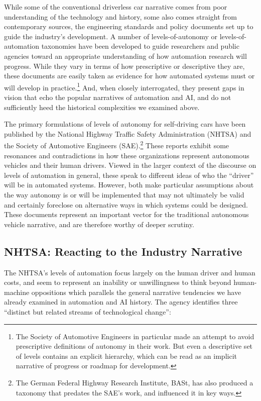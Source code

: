 While some of the conventional driverless car narrative comes from
poor understanding of the technology and history, some also comes
straight from contemporary sources, the engineering standards and
policy documents set up to
guide the industry's development. A number of levels-of-autonomy or
levels-of-automation taxonomies have been developed to guide
researchers and public agencies toward an appropriate understanding of
how automation research will progress. While they vary in terms of how
prescriptive or descriptive they are, these documents are easily taken
as evidence for how automated systems must or will develop in
practice.\footnote{The Society of Automotive Engineers in particular
  made an attempt to avoid prescriptive definitions of autonomy in
  their work. But even a descriptive set of levels contains an
  explicit hierarchy, which can be read as an implicit narrative of
  progress or roadmap for development.} And, when closely
interrogated, they present gaps in vision that echo the popular
narratives of automation and AI, and do not sufficiently heed the
historical complexities we examined above.

The primary formulations of levels of autonomy for self-driving cars
have been published by the National Highway Traffic Safety
Administration (NHTSA) and the Society of Automotive Engineers
(SAE).\footnote{The German Federal Highway Research Institute, BASt,
 has also produced a taxonomy that predates the SAE's work, and
 influenced it in key ways.}
These reports exhibit some resonances and contradictions in how these
organizations represent autonomous vehicles and their human drivers.
Viewed in the larger context of the discourse on levels of automation
in general, these speak to different ideas of who the ``driver'' will be
in automated systems. However, both make particular assumptions about
the way autonomy is or will be implemented that may not ultimately be
valid and certainly foreclose on alternative ways in
which systems could be designed. These documents represent an important
vector for the traditional autonomous vehicle narrative, and are
therefore worthy of deeper scrutiny.

\subsection{NHTSA: Reacting to the Industry Narrative}

The NHTSA's levels of automation focus largely on the human driver and
human costs, and seem to represent an inability or unwillingness to
think beyond human-machine oppositions which 
parallels the general narrative tendencies we have already examined in
automation and AI history. 
The agency identifies three ``distinct but related streams of
technological change'': 

